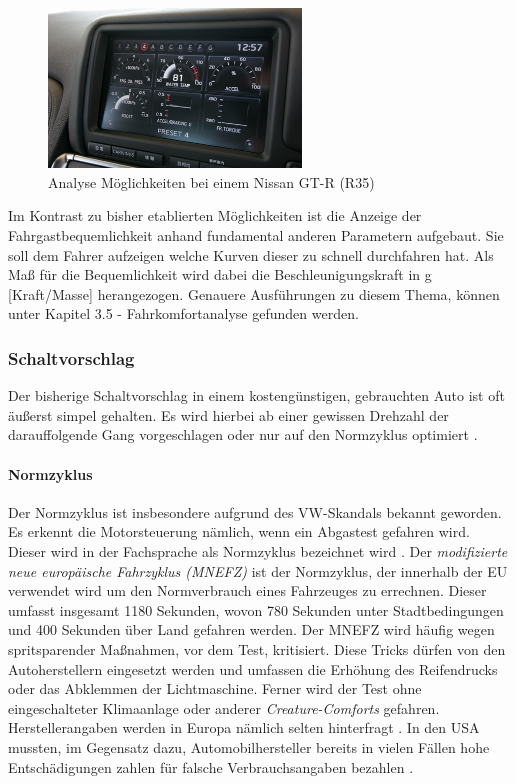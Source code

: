 \begin{figure}[!htb]\centering
	\includegraphics[width=0.6\textwidth]{images/gtrMultifunc}
	\caption{Analyse Möglichkeiten bei einem Nissan GT-R (R35) \cite{SIMR.CH1-Fahrstil-Analyse.GTRMultifunc}}\label{Fig:imgGTR}
\end{figure}

Im Kontrast zu bisher etablierten Möglichkeiten ist die Anzeige der Fahrgastbequemlichkeit anhand fundamental anderen Parametern aufgebaut. Sie soll dem Fahrer aufzeigen welche Kurven dieser zu schnell durchfahren hat. Als Maß für die Bequemlichkeit wird dabei die Beschleunigungskraft in g [Kraft/Masse] herangezogen. Genauere Ausführungen zu diesem Thema, können unter Kapitel 3.5 - Fahrkomfortanalyse gefunden werden.

\subsubsection{Schaltvorschlag}
Der bisherige Schaltvorschlag in einem kostengünstigen, gebrauchten Auto ist oft äußerst simpel gehalten. Es wird hierbei ab einer gewissen Drehzahl der darauffolgende Gang vorgeschlagen oder nur auf den Normzyklus optimiert \cite{SIMR.CH1-Fahrstil-Analyse.Schaltempfehlung}.
\paragraph{Normzyklus}
Der Normzyklus ist insbesondere aufgrund des VW-Skandals bekannt geworden. Es erkennt die Motorsteuerung nämlich, wenn ein Abgastest gefahren wird. Dieser wird in der Fachsprache als Normzyklus bezeichnet wird \cite{SIMR.CH1-fahrstil-analyse.Normzyklus}. Der \textit{modifizierte neue europäische Fahrzyklus (MNEFZ)} ist der Normzyklus, der innerhalb der EU verwendet wird um den Normverbrauch eines Fahrzeuges zu errechnen. Dieser umfasst insgesamt 1180 Sekunden, wovon 780 Sekunden unter Stadtbedingungen und 400 Sekunden über Land gefahren werden. Der MNEFZ wird häufig wegen spritsparender Maßnahmen, vor dem Test, kritisiert. Diese Tricks dürfen von den Autoherstellern eingesetzt werden und umfassen die Erhöhung des Reifendrucks oder das Abklemmen der Lichtmaschine. Ferner wird der Test ohne eingeschalteter Klimaanlage oder anderer \textit{Creature-Comforts} gefahren. Herstellerangaben werden in Europa nämlich selten hinterfragt \cite{SIMR.CH1-fahrstil-analyse.MNEFZ}. In den USA mussten, im Gegensatz dazu, Automobilhersteller bereits in vielen Fällen hohe Entschädigungen zahlen für falsche Verbrauchsangaben bezahlen \cite{SIMR.CH1-fahrstil-analyse.falscherVerbrauchUS}.
